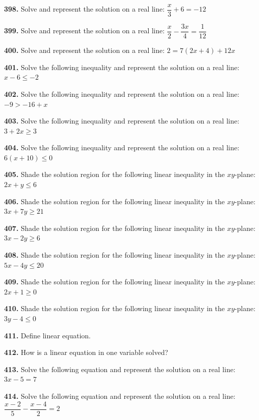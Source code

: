 \documentclass[11pt]{article}
\begin{document}
\bigskip
\noindent\textbf{398.} Solve and represent the solution on a real line: $\dfrac{x}{3}+6=-12$

\bigskip
\noindent\textbf{399.} Solve and represent the solution on a real line: $\dfrac{x}{2}-\dfrac{3x}{4}=\dfrac{1}{12}$

\bigskip
\noindent\textbf{400.} Solve and represent the solution on a real line: $2=7(2x+4)+12x$

\bigskip
\noindent\textbf{401.} Solve the following inequality and represent the solution on a real line: $x-6\leq-2$

\bigskip
\noindent\textbf{402.} Solve the following inequality and represent the solution on a real line: $-9>-16+x$

\bigskip
\noindent\textbf{403.} Solve the following inequality and represent the solution on a real line: $3+2x\geq3$

\bigskip
\noindent\textbf{404.} Solve the following inequality and represent the solution on a real line: $6(x+10)\leq0$

\bigskip
\noindent\textbf{405.} Shade the solution region for the following linear inequality in the $xy$-plane: $2x+y\leq6$

\bigskip
\noindent\textbf{406.} Shade the solution region for the following linear inequality in the $xy$-plane: $3x+7y\geq21$

\bigskip
\noindent\textbf{407.} Shade the solution region for the following linear inequality in the $xy$-plane: $3x-2y\geq6$

\bigskip
\noindent\textbf{408.} Shade the solution region for the following linear inequality in the $xy$-plane: $5x-4y\leq20$

\bigskip
\noindent\textbf{409.} Shade the solution region for the following linear inequality in the $xy$-plane: $2x+1\geq0$

\bigskip
\noindent\textbf{410.} Shade the solution region for the following linear inequality in the $xy$-plane: $3y-4\leq0$

\bigskip
\noindent\textbf{411.} Define linear equation.

\bigskip
\noindent\textbf{412.} How is a linear equation in one variable solved?

\bigskip
\noindent\textbf{413.} Solve the following equation and represent the solution on a real line: $3x-5=7$

\bigskip
\noindent\textbf{414.} Solve the following equation and represent the solution on a real line: $\dfrac{x-2}{5}-\dfrac{x-4}{2}=2$
\end{document}

